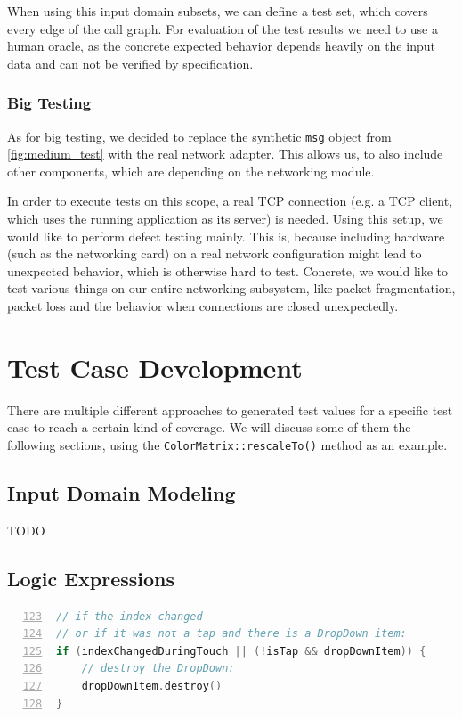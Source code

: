 \documentclass{scrreprt}
\begin{document}
When using this input domain subsets, we can define a test set, which covers every edge of the call graph. For evaluation of the test results we need to use a human oracle, as the concrete expected behavior depends heavily on the input data and can not be verified by specification.

\subsubsection{Big Testing}

As for big testing, we decided to replace the synthetic \texttt{msg} object from \vref{fig:medium_test} with the real network adapter. This allows us, to also include other components, which are depending on the networking module.

In order to execute tests on this scope, a real TCP connection (e.g. a TCP client, which uses the running application as its server) is needed. Using this setup, we would like to perform defect testing mainly. This is, because including hardware (such as the networking card) on a real network configuration might lead to unexpected behavior, which is otherwise hard to test. Concrete, we would like to test various things on our entire networking subsystem, like packet fragmentation, packet loss and the behavior when connections are closed unexpectedly. %

\section{Test Case Development}

There are multiple different approaches to generated test values for a specific test case to reach a certain kind of coverage. We will discuss some of them the following sections, using the \texttt{ColorMatrix::rescaleTo()} method as an example.

\subsection{Input Domain Modeling}

TODO


\subsection{Logic Expressions}

\bigskip
\begin{lstlisting}[language=C++,
					numbers=left,
					firstnumber=123,
					directivestyle={\color{black}}
					emph={int,char,double,float,unsigned},
					emphstyle={\color{blue}},
					title=qml/CustomControls/ComboBox2.qml]
// if the index changed
// or if it was not a tap and there is a DropDown item:
if (indexChangedDuringTouch || (!isTap && dropDownItem)) {
	// destroy the DropDown:
	dropDownItem.destroy()
}
\end{lstlisting}
\bigskip
\end{document}

